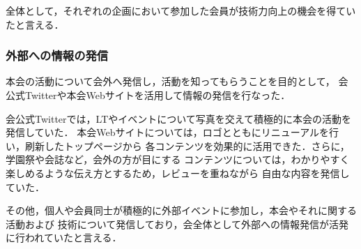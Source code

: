 全体として，それぞれの企画において参加した会員が技術力向上の機会を得ていたと言える．

\subsubsection*{外部への情報の発信}
本会の活動について会外へ発信し，活動を知ってもらうことを目的として，
会公式Twitterや本会Webサイトを活用して情報の発信を行なった．

会公式Twitterでは，LTやイベントについて写真を交えて積極的に本会の活動を発信していた．
本会Webサイトについては，ロゴとともにリニューアルを行い，刷新したトップページから
各コンテンツを効果的に活用できた．さらに，学園祭や会誌など，会外の方が目にする
コンテンツについては，わかりやすく楽しめるような伝え方とするため，レビューを重ねながら
自由な内容を発信していた．

その他，個人や会員同士が積極的に外部イベントに参加し，本会やそれに関する活動および
技術について発信しており，会全体として外部への情報発信が活発に行われていたと言える．
